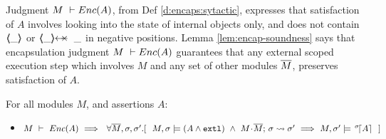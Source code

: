 Judgment $M\ \vdash {\ensuremath Enc( A )}$, from Def \ref{d:encaps:sytactic},   expresses that satisfaction of $A$ involves looking into the state of  
internal objects only, and   does not contain $\langle\!\!\langle \_ \rangle\!\!\rangle$ or $\protectedFrom {\_} {\_}$  in negative positions.   Lemma \ref{lem:encap-soundness} says that encapsulation judgment  $M\ \vdash {\ensuremath Enc( A )}$  guarantees 
that any external scoped execution step which involves $M$ and any set of other modules $\overline{M}$, %
preserves satisfaction of $A$. %
 

\begin{lemma}[Encapsulation] %
\label{d:encaps}  For all modules $M$, and assertions $A$:  
\label{lem:encap-soundness}

\begin{itemize}

 
\item
$ \proves{M}{\encaps{A}}   \ \Longrightarrow\ \ \forall \Mtwo, \sigma, \sigma'.[   \ \  \satisfiesA{M}{\sigma}{(A  \wedge \externalexec)}\  \wedge\ { \leadstoBounded {M\madd\Mtwo}  {\sigma}{\sigma'}} %
        \  \Longrightarrow\  
    {M},{\sigma'}\models {\as \sigma A} \ \  ]$
 \end{itemize}
  
 \end{lemma}

